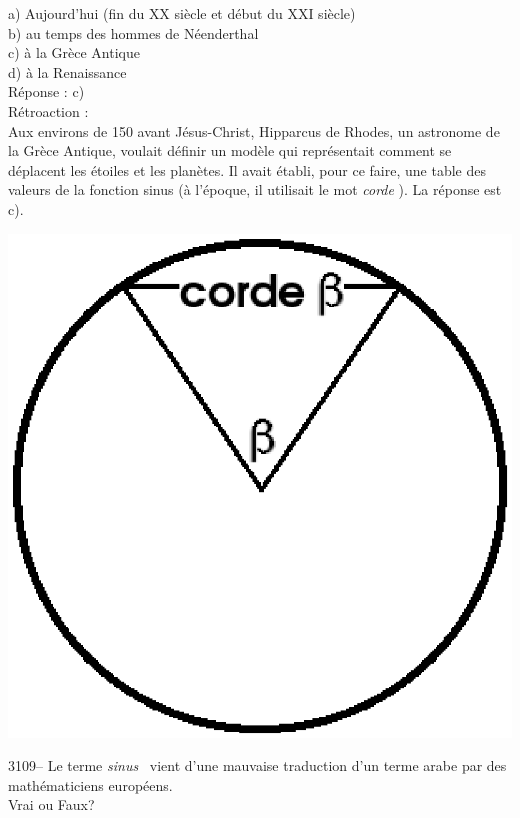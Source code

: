 \documentclass[letterpaper, 12pt]{article}
\begin{document}
a) Aujourd'hui (fin du {\scriptsize XX\ieme{}} si\`ecle et d\'ebut du {\scriptsize XXI\ieme{}} si\`ecle)\\
b) au temps des hommes de N\'eenderthal\\
c) \`a la Gr\`ece Antique\\
d) \`a la Renaissance\\

R\'eponse : c)\\

R\'etroaction :\\
Aux environs de 150 avant J\'esus-Christ, Hipparcus de Rhodes, un astronome de la Gr\`ece Antique, voulait d\'efinir un mod\`ele qui repr\'esentait comment se d\'eplacent les \'etoiles et les plan\`etes. Il avait \'etabli, pour ce faire, une table des valeurs de la fonction sinus (\`a l'\'epoque, il utilisait le mot \og \emph{corde} \fg). La r\'eponse est c).
\begin{center}
\includegraphics[scale=0.3]{cordesinus.eps}
\end{center}



3109-- Le terme \og \emph{sinus} \fg \ vient d'une mauvaise traduction d'un terme arabe par des math\'ematiciens europ\'eens.\\
Vrai ou Faux?\\
\end{document}
